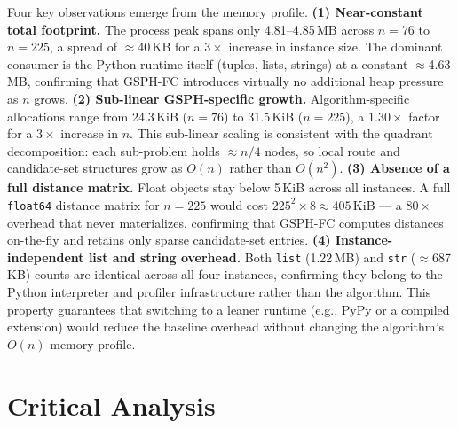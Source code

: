 \documentclass[runningheads]{llncs}
\begin{document}
Four key observations emerge from the memory profile.
%
\textbf{(1) Near-constant total footprint.}
The process peak spans only 4.81--4.85\,MB across $n=76$ to $n=225$,
a spread of $\approx$40\,KB for a $3\times$ increase in instance
size. The dominant consumer is the Python runtime itself (tuples,
lists, strings) at a constant $\approx$4.63\,MB, confirming that
GSPH-FC introduces virtually no additional heap pressure as $n$ grows.
%
\textbf{(2) Sub-linear GSPH-specific growth.}
Algorithm-specific allocations range from 24.3\,KiB ($n=76$) to
31.5\,KiB ($n=225$), a $1.30\times$ factor for a $3\times$ increase
in $n$. This sub-linear scaling is consistent with the quadrant
decomposition: each sub-problem holds $\approx n/4$ nodes, so local
route and candidate-set structures grow as $O(n)$ rather than $O(n^2)$.
%
\textbf{(3) Absence of a full distance matrix.}
Float objects stay below 5\,KiB across all instances. A full
\texttt{float64} distance matrix for $n=225$ would cost
$225^2\times 8\approx 405$\,KiB — a $80\times$ overhead that
never materializes, confirming that GSPH-FC computes distances
on-the-fly and retains only sparse candidate-set entries.
%
\textbf{(4) Instance-independent list and string overhead.}
Both \texttt{list} (1.22\,MB) and \texttt{str} ($\approx$687\,KB)
counts are identical across all four instances, confirming they
belong to the Python interpreter and profiler infrastructure rather
than the algorithm. This property guarantees that switching to a
leaner runtime (e.g., PyPy or a compiled extension) would reduce
the baseline overhead without changing the algorithm's $O(n)$
memory profile.


\section{Critical Analysis}
\label{sec:analysis}
\end{document}
